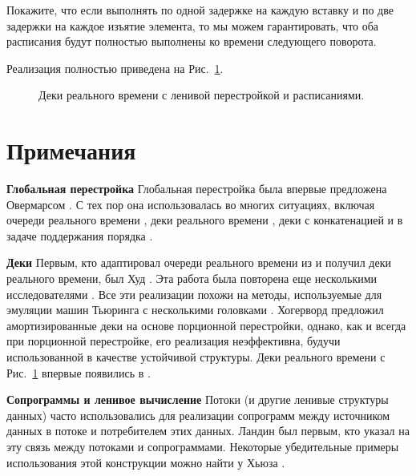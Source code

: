 \begin{exercise}\label{ex:8.7}
  Покажите, что если выполнять по одной задержке на каждую вставку и
  по две задержки на каждое изъятие элемента, то мы можем
  гарантировать, что оба расписания будут полностью выполнены ко
  времени следующего поворота.
\end{exercise}

Реализация полностью приведена на Рис.~\ref{fig:8.4}.

\begin{figure}
  \centering
  
  \caption{Деки реального времени с ленивой перестройкой и расписаниями.}
  \label{fig:8.4}
\end{figure}

\section{Примечания}
\label{sc:8.5}

\textbf{Глобальная перестройка} Глобальная перестройка была впервые
предложена Овермарсом \cite{Overmars1983}. С тех пор она
использовалась во многих ситуациях, включая очереди реального времени
\cite{HoodMelville1981}, деки реального времени \cite{Hood1982,
  GajewskaTarjan1986, Sarnak1986, ChuangGoldberg1993}, деки с
конкатенацией \cite{BuchsbaumTarjan1995} и в задаче поддержания
порядка \cite{DietzSleator1987}.

\textbf{Деки} Первым, кто адаптировал очереди реального времени из
\cite{HoodMelville1981} и получил деки реального времени, был Худ
\cite{Hood1982}. Эта работа была повторена еще несколькими
исследователями \cite{GajewskaTarjan1986, Sarnak1986,
  ChuangGoldberg1993}. Все эти реализации похожи на методы,
используемые для эмуляции машин Тьюринга с несколькими головками
\cite{Stoss1970, FischerMeyerRosenberg1972,
  LeongSeiferas1981}. Хогерворд \cite{Hoogerwoord1992} предложил
амортизированные деки на основе порционной перестройки, однако, как и
всегда при порционной перестройке, его реализация
неэффективна, будучи использованной в качестве устойчивой структуры. Деки
реального времени с Рис.~\ref{fig:8.4} впервые появились в
\cite{Okasaki1995c}.

\textbf{Сопрограммы и ленивое вычисление} Потоки (и другие ленивые
структуры данных) часто использовались для реализации сопрограмм между
источником данных в потоке и потребителем этих данных. Ландин
\cite{Landin1965} был первым, кто указал на эту связь между потоками и
сопрограммами. Некоторые убедительные примеры использования этой
конструкции можно найти у Хьюза \cite{Hughes1989}.

